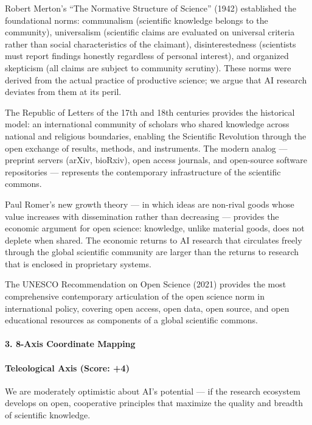 Robert Merton's ``The Normative Structure of Science'' (1942)
established the foundational norms: communalism (scientific knowledge
belongs to the community), universalism (scientific claims are evaluated
on universal criteria rather than social characteristics of the
claimant), disinterestedness (scientists must report findings honestly
regardless of personal interest), and organized skepticism (all claims
are subject to community scrutiny). These norms were derived from the
actual practice of productive science; we argue that AI research
deviates from them at its peril.

The Republic of Letters of the 17th and 18th centuries provides the
historical model: an international community of scholars who shared
knowledge across national and religious boundaries, enabling the
Scientific Revolution through the open exchange of results, methods, and
instruments. The modern analog --- preprint servers (arXiv, bioRxiv),
open access journals, and open-source software repositories ---
represents the contemporary infrastructure of the scientific commons.

Paul Romer's new growth theory --- in which ideas are non-rival goods
whose value increases with dissemination rather than decreasing ---
provides the economic argument for open science: knowledge, unlike
material goods, does not deplete when shared. The economic returns to AI
research that circulates freely through the global scientific community
are larger than the returns to research that is enclosed in proprietary
systems.

The UNESCO Recommendation on Open Science (2021) provides the most
comprehensive contemporary articulation of the open science norm in
international policy, covering open access, open data, open source, and
open educational resources as components of a global scientific commons.

\paragraph{3. 8-Axis Coordinate
Mapping}\label{axis-coordinate-mapping-27}

\paragraph{Teleological Axis (Score:
+4)}\label{teleological-axis-score-4-3}

We are moderately optimistic about AI's potential --- if the research
ecosystem develops on open, cooperative principles that maximize the
quality and breadth of scientific knowledge.

